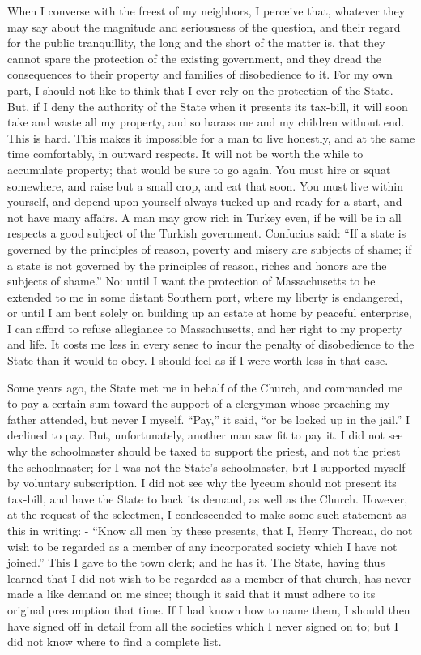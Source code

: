 \documentclass[letterpaper,12pt,english]{sphinxmanual}
\begin{document}
When I converse with the freest of my neighbors, I perceive that, whatever they may say about the magnitude and seriousness of the question, and their regard for the public tranquillity, the long and the short of the matter is, that they cannot spare the protection of the existing government, and they dread the consequences to their property and families of disobedience to it. For my own part, I should not like to think that I ever rely on the protection of the State. But, if I deny the authority of the State when it presents its tax-bill, it will soon take and waste all my property, and so harass me and my children without end. This is hard. This makes it impossible for a man to live honestly, and at the same time comfortably, in outward respects. It will not be worth the while to accumulate property; that would be sure to go again. You must hire or squat somewhere, and raise but a small crop, and eat that soon. You must live within yourself, and depend upon yourself always tucked up and ready for a start, and not have many affairs. A man may grow rich in Turkey even, if he will be in all respects a good subject of the Turkish government. Confucius said: ``If a state is governed by the principles of reason, poverty and misery are subjects of shame; if a state is not governed by the principles of reason, riches and honors are the subjects of shame.'' No: until I want the protection of Massachusetts to be extended to me in some distant Southern port, where my liberty is endangered, or until I am bent solely on building up an estate at home by peaceful enterprise, I can afford to refuse allegiance to Massachusetts, and her right to my property and life. It costs me less in every sense to incur the penalty of disobedience to the State than it would to obey. I should feel as if I were worth less in that case.

Some years ago, the State met me in behalf of the Church, and commanded me to pay a certain sum toward the support of a clergyman whose preaching my father attended, but never I myself. ``Pay,'' it said, ``or be locked up in the jail.'' I declined to pay. But, unfortunately, another man saw fit to pay it. I did not see why the schoolmaster should be taxed to support the priest, and not the priest the schoolmaster; for I was not the State's schoolmaster, but I supported myself by voluntary subscription. I did not see why the lyceum should not present its tax-bill, and have the State to back its demand, as well as the Church. However, at the request of the selectmen, I condescended to make some such statement as this in writing: - ``Know all men by these presents, that I, Henry Thoreau, do not wish to be regarded as a member of any incorporated society which I have not joined.'' This I gave to the town clerk; and he has it. The State, having thus learned that I did not wish to be regarded as a member of that church, has never made a like demand on me since; though it said that it must adhere to its original presumption that time. If I had known how to name them, I should then have signed off in detail from all the societies which I never signed on to; but I did not know where to find a complete list.
\end{document}
